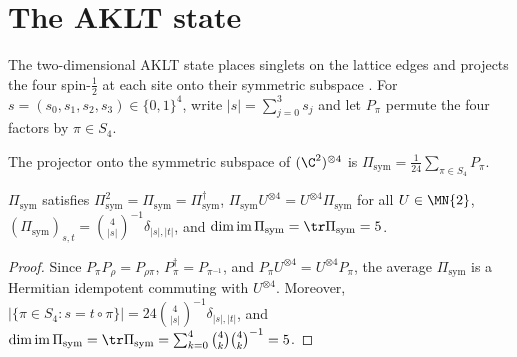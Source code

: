\section{The AKLT state}%
\label{sec:peps_aklt}

The two-dimensional AKLT state places singlets on the lattice edges and projects
the four spin-$\tfrac12$ at each site onto their symmetric subspace
\cite[Appendix~A, ``The AKLT model'']{Cirac2021Matrix}. For
$s=(s_0,s_1,s_2,s_3)\in\{0,1\}^4$, write $|s|=\sum_{j=0}^3 s_j$ and let
$P_{\pi}$ permute the four factors by $\pi\in S_4$.

\begin{definition}%
    \label{def:peps_aklt_sym_projector}
    \leanok
    The projector onto the symmetric subspace of $(\C^2)^{\otimes 4}$ is
    $\Pi_{\mathrm{sym}}=\frac{1}{24}\sum_{\pi\in S_4}P_{\pi}$.
\end{definition}

\begin{lemma}%
    \label{lem:peps_aklt_sym_projector}
    \leanok
    $\Pi_{\mathrm{sym}}$ satisfies $\Pi_{\mathrm{sym}}^2=\Pi_{\mathrm{sym}}=\Pi_{\mathrm{sym}}^\dagger$,
    $\Pi_{\mathrm{sym}}U^{\otimes 4}=U^{\otimes 4}\Pi_{\mathrm{sym}}$ for all
    $U\in\MN{2}$, $(\Pi_{\mathrm{sym}})_{s,t}=\binom{4}{|s|}^{-1}\delta_{|s|,|t|}$,
    and $\dim\operatorname{im}\Pi_{\mathrm{sym}}=\tr\Pi_{\mathrm{sym}}=5$.
\end{lemma}

\begin{proof}\leanok
    Since $P_{\pi}P_{\rho}=P_{\rho\pi}$, $P_{\pi}^{\dagger}=P_{\pi^{-1}}$, and
    $P_{\pi}U^{\otimes 4}=U^{\otimes 4}P_{\pi}$, the average $\Pi_{\mathrm{sym}}$
    is a Hermitian idempotent commuting with $U^{\otimes 4}$. Moreover,
    $|\{\pi\in S_4:s=t\circ\pi\}|=24\binom{4}{|s|}^{-1}\delta_{|s|,|t|}$, and
    $\dim\operatorname{im}\Pi_{\mathrm{sym}}=\tr\Pi_{\mathrm{sym}}=\sum_{k=0}^{4}\binom4k\binom4k^{-1}=5$.
\end{proof}

